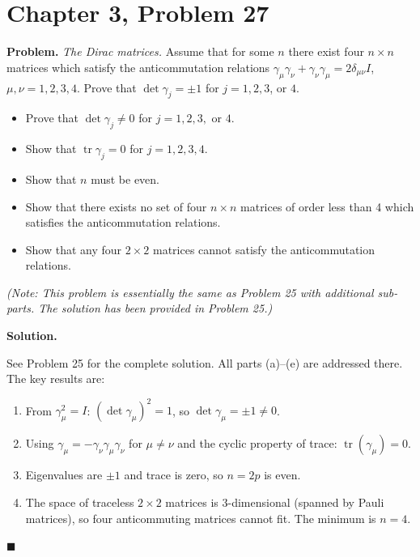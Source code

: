 \documentclass[12pt]{article}
\begin{document}
\section*{Chapter 3, Problem 27}

\textbf{Problem.} \textit{The Dirac matrices.} Assume that for some $n$ there exist four $n \times n$ matrices which satisfy the anticommutation relations $\gamma_\mu\gamma_\nu + \gamma_\nu\gamma_\mu = 2\delta_{\mu\nu}I$, $\mu, \nu = 1, 2, 3, 4$. Prove that $\det\gamma_j = \pm 1$ for $j = 1, 2, 3$, or $4$.

\begin{itemize}
    \item[(a)] Prove that $\det\gamma_j \neq 0$ for $j = 1, 2, 3, \text{ or } 4$.
    \item[(b)] Show that $\operatorname{tr}\gamma_j = 0$ for $j = 1, 2, 3, 4$.
    \item[(c)] Show that $n$ must be even.
    \item[(d)] Show that there exists no set of four $n \times n$ matrices of order less than 4 which satisfies the anticommutation relations.
    \item[(e)] Show that any four $2 \times 2$ matrices cannot satisfy the anticommutation relations.
\end{itemize}

\textit{(Note: This problem is essentially the same as Problem 25 with additional sub-parts. The solution has been provided in Problem 25.)}

\bigskip
\textbf{Solution.}

See Problem 25 for the complete solution. All parts (a)--(e) are addressed there. The key results are:

\begin{enumerate}
    \item From $\gamma_\mu^2 = I$: $(\det\gamma_\mu)^2 = 1$, so $\det\gamma_\mu = \pm 1 \neq 0$.
    \item Using $\gamma_\mu = -\gamma_\nu\gamma_\mu\gamma_\nu$ for $\mu \neq \nu$ and the cyclic property of trace: $\operatorname{tr}(\gamma_\mu) = 0$.
    \item Eigenvalues are $\pm 1$ and trace is zero, so $n = 2p$ is even.
    \item The space of traceless $2\times 2$ matrices is 3-dimensional (spanned by Pauli matrices), so four anticommuting matrices cannot fit. The minimum is $n = 4$.
\end{enumerate}
\hfill $\blacksquare$
\end{document}
